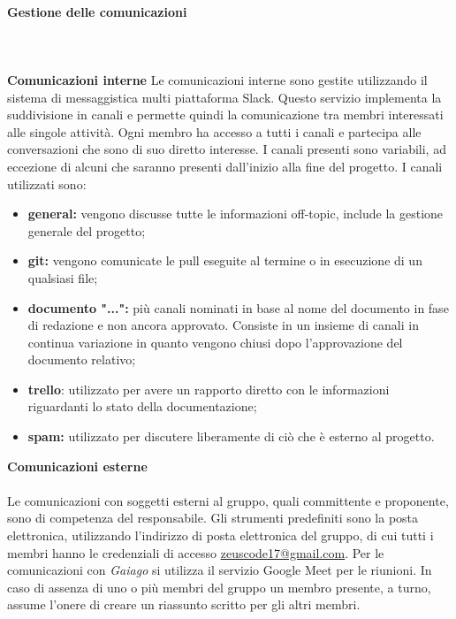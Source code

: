 			\paragraph{Gestione delle comunicazioni} \mbox{}\\ \mbox{}\\
			\textbf{Comunicazioni interne} \newline \newline
			Le comunicazioni interne sono gestite utilizzando il sistema di messaggistica multi piattaforma Slack\glo. Questo servizio implementa la suddivisione in canali e permette quindi la comunicazione tra membri interessati alle singole attività. Ogni membro ha accesso a tutti i canali e partecipa alle conversazioni che sono di suo diretto interesse. I canali presenti sono variabili, ad eccezione di alcuni che saranno presenti dall'inizio alla fine del progetto.
			I canali utilizzati sono:
			\begin{itemize}
				\item \textbf{general:} vengono discusse tutte le informazioni off-topic\glo, include la gestione generale del progetto;
				\item \textbf{git:} vengono comunicate le pull eseguite al termine o in esecuzione di un qualsiasi file;
				\item \textbf{documento "...":} più canali nominati in base al nome del documento in fase di redazione e non ancora approvato. Consiste in un insieme di canali in continua variazione in quanto vengono chiusi dopo l'approvazione del documento relativo;
				\item \textbf{trello\glo}: utilizzato per avere un rapporto diretto con le informazioni riguardanti lo stato della documentazione;
				\item \textbf{spam:} utilizzato per discutere liberamente di ciò che è esterno al progetto.
			\end{itemize}
			\textbf{Comunicazioni esterne} \mbox{}\\ \mbox{}\\
			Le comunicazioni con soggetti esterni al gruppo, quali committente e proponente, sono di competenza del responsabile. Gli strumenti predefiniti sono la posta elettronica, utilizzando l'indirizzo di posta elettronica del gruppo, di cui tutti i membri hanno le credenziali di accesso  \url{zeuscode17@gmail.com}.
			Per le comunicazioni con \textit{Gaiago} si utilizza il servizio Google Meet per le riunioni. In caso di assenza di uno o più membri del gruppo un membro presente, a turno, assume l'onere di creare un riassunto scritto per gli altri membri.
			\newline
